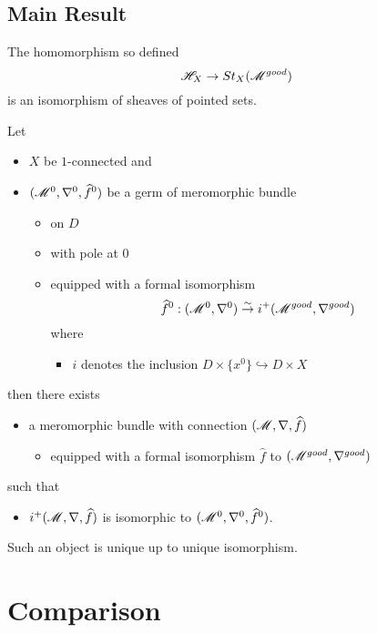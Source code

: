 \subsection{Main Result}
\begin{thm}
  The homomorphism so defined
  \[
    \mathscr{H}_X\to St_X(\mathscr{M}^{good})
  \]
  is an isomorphism of sheaves of pointed sets.
\end{thm}
\begin{cor}
  Let
  \begin{itemize}
    \item $X$ be $1$-connected and
    \item $(\mathscr{M}^0,\nabla^0,\widehat f^0)$ be a germ of meromorphic bundle
      \begin{itemize}
        \item on $D$
        \item with pole at $0$
        \item equipped with a formal isomorphism
          \[
            \widehat f^0:(\mathscr{M}^0,\nabla^0)
              \overset{\sim}{\to}
              i^+(\mathscr{M}^{good},\nabla^{good})
          \]
          where
          \begin{itemize}
            \item $i$ denotes the inclusion
              $D\times\{x^0\}\hookrightarrow D\times X$
          \end{itemize}
      \end{itemize}
  \end{itemize}
  then there exists
  \begin{itemize}
    \item a meromorphic bundle with connection $(\mathscr{M},\nabla,\widehat f)$
      \begin{itemize}
        \item equipped with a formal isomorphism $\hat f$ to
          $(\mathscr{M}^{good},\nabla^{good})$
      \end{itemize}
  \end{itemize}
  such that
  \begin{itemize}
    \item $i^+(\mathscr{M},\nabla,\widehat f)$ is isomorphic to
      $(\mathscr{M}^0,\nabla^0,\widehat f^0)$.
  \end{itemize}
  Such an object is unique up to unique isomorphism.
\end{cor}

\section{Comparison}
